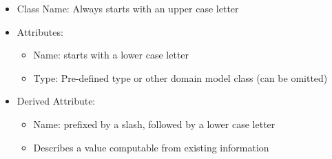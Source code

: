 \documentclass[
../../Software_Engineering_Summary.tex,
]
{subfiles}
\begin{document}
\begin{defbox}
    \begin{itemize}
        \item Class Name: Always starts with an upper case letter
        \item Attributes:
        \begin{itemize}
            \item Name: starts with a lower case letter
            \item Type: Pre-defined type or other domain model class (can be omitted)
        \end{itemize}
        \item Derived Attribute:
        \begin{itemize}
            \item Name: prefixed by a slash, followed by a lower case letter
            \item Describes a value computable from existing information
        \end{itemize}
    \end{itemize}
\end{defbox}
\end{document}
